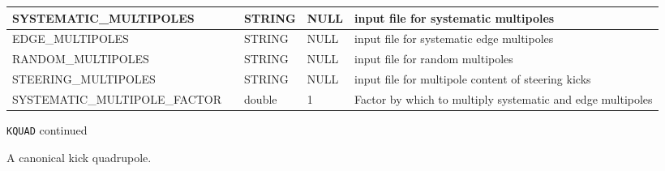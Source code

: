 \begin{tabular}{|l|l|l|l|p{\descwidth}|}
SYSTEMATIC\_MULTIPOLES &  & STRING &   NULL            & input file for systematic multipoles  \\ \hline 
EDGE\_MULTIPOLES &  & STRING &   NULL            & input file for systematic edge multipoles  \\ \hline 
RANDOM\_MULTIPOLES &  & STRING &   NULL            & input file for random multipoles  \\ \hline 
STEERING\_MULTIPOLES &  & STRING &   NULL            & input file for multipole content of steering kicks  \\ \hline 
SYSTEMATIC\_MULTIPOLE\_FACTOR &  & double &   1 & Factor by which to multiply systematic and edge multipoles  \\ \hline 
\end{tabular}

\newpage
\begin{center}{\Large\verb|KQUAD| continued}\end{center}
A canonical kick quadrupole.
\\
